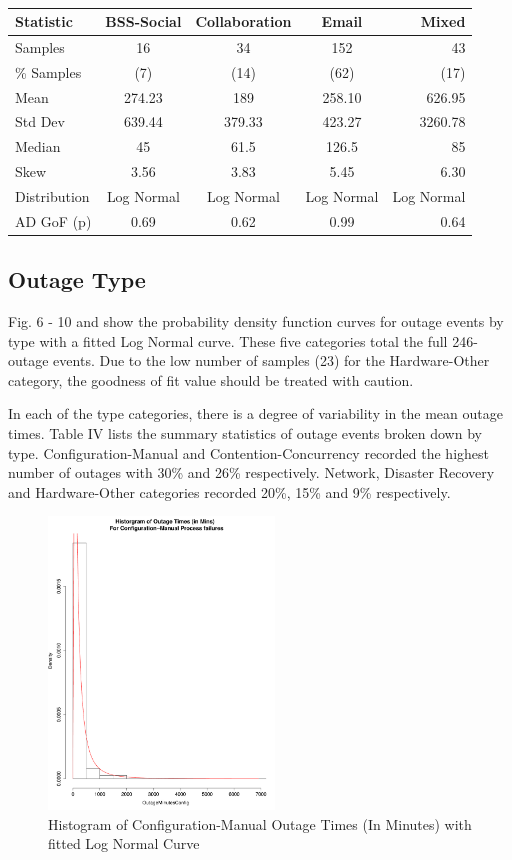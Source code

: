 \documentclass[conference]{IEEEtran}
\begin{document}
\begin {table}
\caption {}
\begin{center}
\begin{tabular}{l*{3}{c}r} Statistic & BSS-Social & Collaboration & Email & Mixed
\\ \hline Samples & 16 & 34 & 152 & 43
\\ \% Samples & (7) & (14) & (62) & (17)
\\ Mean & 274.23 & 189 & 258.10 & 626.95
\\ Std Dev & 639.44 & 379.33 & 423.27 & 3260.78
\\ Median & 45	& 61.5 & 126.5 & 85
\\ Skew & 3.56	& 3.83 & 5.45 & 6.30
\\ Distribution & Log Normal & Log Normal & Log Normal  & Log Normal
\\AD GoF (p) & 0.69 & 0.62 & 0.99 & 0.64
\end{tabular}
\end{center}
\end{table}

\subsection{Outage Type}

Fig. 6 - 10 and show the probability density function curves for outage events by type with a fitted Log Normal curve. These five categories total the full 246-outage events. Due to the low number of samples (23) for the Hardware-Other category, the goodness of fit value should be treated with caution. \par

In each of the type categories, there is a degree of variability in the mean outage times. Table IV lists the summary statistics of outage events broken down by type. Configuration-Manual and Contention-Concurrency recorded the highest number of outages with 30\% and 26\% respectively. Network, Disaster Recovery and Hardware-Other categories recorded 20\%, 15\% and 9\% respectively. 

\begin{figure}
\begin{center}
\includegraphics[width=6cm]{graph6.pdf} 
\caption{ Histogram of Configuration-Manual Outage Times (In Minutes) with fitted Log Normal Curve}
\end{center}
\label{fig:outagedistribution}
\end{figure}
\end{document}
